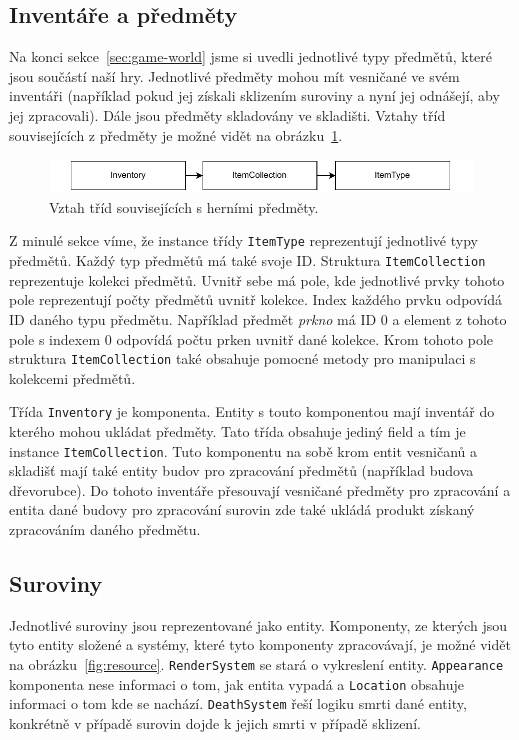 \subsection{Inventáře a předměty}
Na konci sekce~\ref{sec:game-world} jsme si uvedli jednotlivé typy předmětů, které jsou součástí naší hry. Jednotlivé předměty mohou mít vesničané ve svém inventáři (například pokud jej získali sklizením suroviny a nyní jej odnášejí, aby jej zpracovali). Dále jsou předměty skladovány ve skladišti. Vztahy tříd souvisejících z předměty je možné vidět na obrázku~\ref{fig:items}.

\begin{figure}[!htb]
  \centering
  \includegraphics[width=0.8\linewidth]{img/items.pdf}
  \caption{Vztah tříd souvisejících s herními předměty.}
  \label{fig:items}
\end{figure}

Z minulé sekce víme, že instance třídy \texttt{ItemType} reprezentují jednotlivé typy předmětů. Každý typ předmětů má také svoje ID. Struktura \texttt{ItemCollection} reprezentuje kolekci předmětů. Uvnitř sebe má pole, kde jednotlivé prvky tohoto pole reprezentují počty předmětů uvnitř kolekce. Index každého prvku odpovídá ID daného typu předmětu. Například předmět \textit{prkno} má ID 0 a element z tohoto pole s indexem 0 odpovídá počtu prken uvnitř dané kolekce. Krom tohoto pole struktura \texttt{ItemCollection} také obsahuje pomocné metody pro manipulaci s kolekcemi předmětů.

Třída \texttt{Inventory} je komponenta. Entity s touto komponentou mají inventář do kterého mohou ukládat předměty. Tato třída obsahuje jediný field a tím je instance \texttt{ItemCollection}. Tuto komponentu na sobě krom entit vesničanů a skladišť mají také entity budov pro zpracování předmětů (například budova dřevorubce). Do tohoto inventáře přesouvají vesničané předměty pro zpracování a entita dané budovy pro zpracování surovin zde také ukládá produkt získaný zpracováním daného předmětu.

\subsection{Suroviny}
\label{sec:res-impl}
Jednotlivé suroviny jsou reprezentované jako entity. Komponenty, ze kterých jsou tyto entity složené a systémy, které tyto komponenty zpracovávají, je možné vidět na obrázku~\ref{fig:resource}. \texttt{RenderSystem} se stará o vykreslení entity. \texttt{Appearance} komponenta nese informaci o tom, jak entita vypadá a \texttt{Location} obsahuje informaci o tom kde se nachází. \texttt{DeathSystem} řeší logiku smrti dané entity, konkrétně v případě surovin dojde k jejich smrti v případě sklizení.

